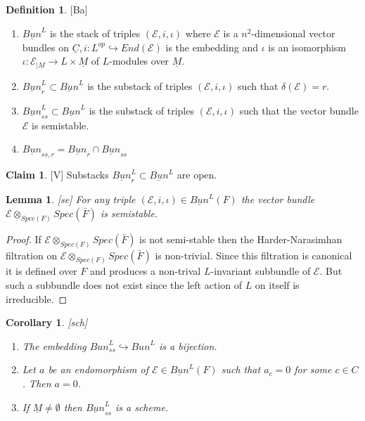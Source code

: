 \documentclass[11pt,a4paper,twoside]{amsart}
\newtheorem{lemma}[theorem]{Lemma}
\newtheorem{corollary}[theorem]{Corollary}
\theoremstyle{definition}
\newtheorem{definition}[theorem]{Definition}
\newtheorem{claim}[theorem]{Claim}
\newcommand{\mcE}{\mathcal E}
\newcommand{\un}{\underline}
\newcommand{\ho}{\hookrightarrow}
\newcommand{\emp}{\emptyset}
\newcommand{\sms}{\smallskip}
\begin{document}
\subsection{}
\begin{definition}\label{Ba}[Ba]

\begin{enumerate} 

\item $  \un {Bun}^L$ is the  stack of triples
 $(\mcE ,i,  \iota) $ where  $\mcE$ is a $n^2$-dimensional vector bundles on $\un C, i : L^{op} \ho End ( \mcE)$ is the embedding  and $ \iota$ is an isomorphism $\iota :\mcE _{|\un M}\to L\times \un M$ of $L$-modules over $\un M$.

\item $\un {Bun}_ r^L \subset  \un {Bun}^L $ is the  substack  of triples
 $(\mcE ,i,  \iota)$ such that 
$\delta ( \mcE)=r$.
\item $ \un {Bun}_{ss}^L \subset \un {Bun}^L $ is the substack of triples  $ (\mcE ,i,  \iota) $ such that the vector bundle $ \mcE $ is semistable.
\item $ \un {Bun}_ {ss,r}= \un {Bun}_r \cap  \un {Bun}_ {ss}$

\end{enumerate}
\end{definition}


\sms


\begin{claim}\label{V}[V] Substacks $\un {Bun}_ r^L \subset \un {Bun}^L $
are open.


\end{claim}

\begin{lemma}\label{se}[se] For any triple
 $(\mcE ,i,  \iota) \in \un {Bun}^L(F) $ the vector bundle $ \mcE \otimes _{Spec (F)} Spec (\bar F) $ is semistable.
\end{lemma}
\begin{proof}

If  $  \mcE \otimes _{Spec (F)} Spec (\bar F) $  is not semi-stable then  the Harder-Narasimhan filtration on  $ \mcE \otimes _{Spec (F)} Spec (\bar F) $
 is   non-trivial. Since this filtration is canonical it is defined over $F$ and produces a non-trival $L$-invariant subbundle of $\mcE$. But such a subbundle does not exist 
since  the left action of $L$ on itself is irreducible.
\end{proof}


\begin{corollary}\label{sch}[sch] \begin{enumerate}
\item The embedding $  {Bun}_{ss}^L \ho  {Bun}^L $ is a bijection.
\item Let  $a$ be an endomorphism of $\mcE \in \un {Bun}^L(F) $ such that $a_c=0$ for some $c\in C$. Then $a=0$. 
\item If $\un M \neq \emp$ then $  \un {Bun} ^L_{ss} $ is a scheme.

\end{enumerate}

\end{corollary}
\end{document}
